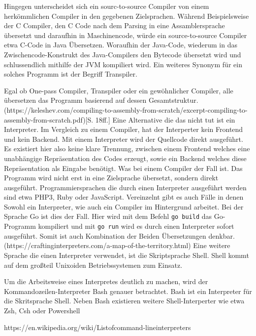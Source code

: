 Hingegen unterscheidet sich ein sourc-to-source Compiler von einem herkömmlichen Compiler in den gegebenen Zielsprachen. Während Beispielsweise der C Compiler, den C Code nach dem Parsing in eine Assamblersprache übersetzt und daraufhin in Maschinencode, würde ein source-to-source Compiler etwa C-Code in Java Übersetzen. Woraufhin der Java-Code, wiederum in das Zwischencode-Konstrukt des Java-Compilers den Bytecode übersetzt wird und schlussendlich mithilfe der JVM kompiliert wird. Ein weiteres Synonym für ein solches Programm ist der Begriff Transpiler.

Egal ob One-pass Compiler, Transpiler oder ein gewöhnlicher Compiler, alle übersetzen das Programm basierend auf dessen Gesamtstruktur. (https://keleshev.com/compiling-to-assembly-from-scratch/excerpt-compiling-to-assembly-from-scratch.pdf)[S. 18ff.] Eine Alternative die das nicht tut ist ein Interpreter.
  Im Vergleich zu einem Compiler, hat der Interperter kein Frontend und kein Backend.
	Mit einem Interpreter wird der Quellcode direkt ausgeführt. Es existiert hier also keine klare Trennung, zwischen einem Frontend welches eine unabhängige Repräsentation des Codes erzeugt, sowie ein Backend welches diese Repräsentation als Eingabe benötigt. Was bei einem Compiler der Fall ist. Das Programm wird nicht erst in eine Zielsprache übersetzt, sondern direkt ausgeführt. 
Programmiersprachen die durch einen Interpreter ausgeführt werden sind etwa PHP3, Ruby oder JavaScript. Vereinzelnt gibt es auch Fälle in denen Sowohl ein Interpreter, wie auch ein Compiler im Hintergrund arbeitet. Bei der Sprache Go ist dies der Fall. Hier wird mit dem Befehl \verb+go build+ das Go-Programm kompiliert und mit \verb+go run+ wird es durch einen Interpreter sofort ausgeführt. Somit ist auch Kombination der Beiden Übersetzungen denkbar. (https://craftinginterpreters.com/a-map-of-the-territory.html)
  Eine weitere Sprache die einen Interpreter verwendet, ist die Skriptsprache Shell. Shell kommt auf dem großteil Unixoiden Betriebssystemen zum Einsatz.
  
  Um die Arbeitsweise eines Interpretes deutlich zu machen, wird der Kommandozeilen-Interpreter Bash genauer betrachtet. Bash ist ein Interpreter für die Skritsprache Shell. Neben Bash existieren weitere Shell-Interperter wie etwa Zsh, Csh oder Powershell

https://en.wikipedia.org/wiki/Listofcommand-lineinterpreters

